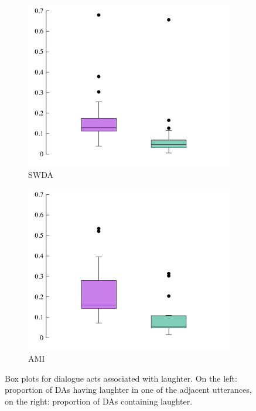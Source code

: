 \documentclass[11pt,a4paper]{article}
\begin{document}
\begin{figure}
\centering
\begin{subfigure}[b]{0.55\textwidth}
  \includegraphics[width=0.9\linewidth]{img/box-swda.pdf}
  \caption{SWDA}
  \label{fig:box-swda}
\end{subfigure}

\begin{subfigure}[b]{0.55\textwidth}
  \includegraphics[width=0.9\linewidth]{img/box-ami.pdf}
  \caption{AMI}
  \label{fig:box-ami}
\end{subfigure}

\caption{Box plots for dialogue acts associated with laughter. On the left: proportion of DAs having laughter in one of the adjacent utterances, on the right: proportion of DAs containing laughter. }
\label{fig:box}
\end{figure}
\end{document}
